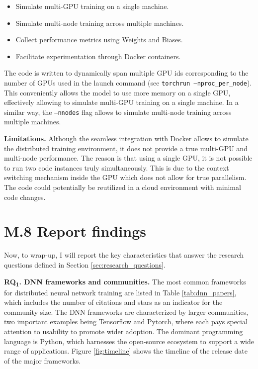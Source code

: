 \begin{itemize}
	\item Simulate multi-GPU training on a single machine.
	\item Simulate multi-node training across multiple machines.
	\item Collect performance metrics using Weights and Biases.
	\item Facilitate experimentation through Docker containers.
\end{itemize}

The code is written to dynamically span multiple GPU ids corresponding to the number of GPUs used
in the launch command (see \texttt{torchrun --nproc\_per\_node}). This conveniently allows the
model to use more memory on a single GPU, effectively allowing to simulate multi-GPU training on a
single machine. In a similar way, the \texttt{--nnodes} flag allows to simulate multi-node training
across multiple machines.

\textbf{Limitations.}
Although the seamless integration with Docker allows to simulate the distributed training
environment, it does not provide a true multi-GPU and multi-node performance. The reason is that
using a single GPU, it is not possible to run two code instances truly simultaneously. This is due
to the context switching mechanism inside the GPU which does not allow for true parallelism. The
code could potentially be reutilized in a cloud environment with minimal code changes.

\section{M.8 Report findings}
\label{sec:report-findings}
Now, to wrap-up, I will report the key characteristics that answer the research questions defined
in Section \ref{sec:research_questions}.

\textbf{RQ\textsubscript{1}. DNN frameworks and communities.}
The most common frameworks for distributed neural network training are listed in Table
\ref{tab:dnn_papers}, which includes the number of citations and stars as an indicator for the community
size. The DNN frameworks are characterized by larger communities, two important examples being
Tensorflow and Pytorch, where each pays special attention to usability to promote wider adoption.
The dominant programming language is Python, which harnesses the open-source ecosystem to support a
wide range of applications. Figure \ref{fig:timeline} shows the timeline of the release date of the
major frameworks.

